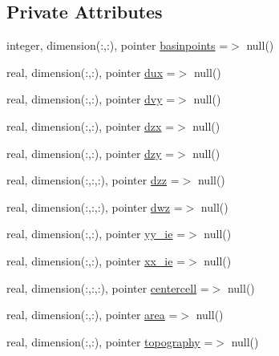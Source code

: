 \subsection*{Private Attributes}
\begin{DoxyCompactItemize}
\item 
integer, dimension(\+:,\+:), pointer \mbox{\hyperlink{structmoduleporousmedia_1_1t__extvar_a9ae10a6b42852af9778d289aac9d0dc4}{basinpoints}} =$>$ null()
\item 
real, dimension(\+:,\+:), pointer \mbox{\hyperlink{structmoduleporousmedia_1_1t__extvar_a3e135dcd9adb532ac45ed15f94855c8c}{dux}} =$>$ null()
\item 
real, dimension(\+:,\+:), pointer \mbox{\hyperlink{structmoduleporousmedia_1_1t__extvar_a334fc5cac5b3f6af227109d3778a26ff}{dvy}} =$>$ null()
\item 
real, dimension(\+:,\+:), pointer \mbox{\hyperlink{structmoduleporousmedia_1_1t__extvar_a6bbf0719aaa9ef71943b6b2162a1d594}{dzx}} =$>$ null()
\item 
real, dimension(\+:,\+:), pointer \mbox{\hyperlink{structmoduleporousmedia_1_1t__extvar_ae725031ee431a5fd17ffa9591120dcf8}{dzy}} =$>$ null()
\item 
real, dimension(\+:,\+:,\+:), pointer \mbox{\hyperlink{structmoduleporousmedia_1_1t__extvar_a8216831c8d2c8ddcd924db5499e5da54}{dzz}} =$>$ null()
\item 
real, dimension(\+:,\+:,\+:), pointer \mbox{\hyperlink{structmoduleporousmedia_1_1t__extvar_a9c057d5919eb5de4852856e571790912}{dwz}} =$>$ null()
\item 
real, dimension(\+:,\+:), pointer \mbox{\hyperlink{structmoduleporousmedia_1_1t__extvar_a0ab1da89aef1337e2a10302cd4e8e2e5}{yy\+\_\+ie}} =$>$ null()
\item 
real, dimension(\+:,\+:), pointer \mbox{\hyperlink{structmoduleporousmedia_1_1t__extvar_a5354c95faae433d76e55a8927f0e45c9}{xx\+\_\+ie}} =$>$ null()
\item 
real, dimension(\+:,\+:,\+:), pointer \mbox{\hyperlink{structmoduleporousmedia_1_1t__extvar_ab1c60f683083551b7bc3d69096e62440}{centercell}} =$>$ null()
\item 
real, dimension(\+:,\+:), pointer \mbox{\hyperlink{structmoduleporousmedia_1_1t__extvar_a68b16373ba81fd151cc4e4c620dcddc8}{area}} =$>$ null()
\item 
real, dimension(\+:,\+:), pointer \mbox{\hyperlink{structmoduleporousmedia_1_1t__extvar_a3b8b6aa7905318cda684da5565ac4282}{topography}} =$>$ null()
\item 

\end{DoxyCompactItemize}
